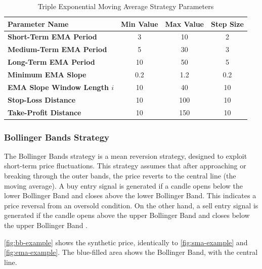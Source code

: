 \begin{table}[H]
    \centering
    \begin{tabular}{L{4cm}ccc}
        \toprule
        \textbf{Parameter Name} & Min Value & Max Value & Step Size
        \\
        \midrule
        \textbf{Short-Term EMA Period}       & 3   & 10  & 2   \\
        \textbf{Medium-Term EMA Period}      & 5   & 30  & 3   \\
        \textbf{Long-Term EMA Period}        & 10  & 50  & 5   \\
        \textbf{Minimum EMA Slope}           & 0.2 & 1.2 & 0.2 \\
        \textbf{EMA Slope Window Length $i$} & 10  & 40  & 10  \\
        \textbf{Stop-Loss Distance}          & 10  & 100 & 10  \\
        \textbf{Take-Profit Distance}        & 10  & 150 & 10  \\
        \bottomrule
    \end{tabular}
    \caption{Triple Exponential Moving Average Strategy Parameters}
    \label{tbl:ema-strategy-parameters}
\end{table}

\subsubsection{Bollinger Bands Strategy}

The Bollinger Bands strategy is a mean reversion strategy, designed to exploit short-term price fluctuations.
This strategy assumes that after approaching or breaking through the outer bands, the price reverts to the central line (the moving average).
A buy entry signal is generated if a candle opens below the lower Bollinger Band and closes above the lower Bollinger Band.
This indicates a price reversal from an oversold condition.
On the other hand, a sell entry signal is generated if the candle opens above the upper Bollinger Band and closes below the upper Bollinger Band \cite{bb-basics}.

\autoref{fig:bb-example} shows the synthetic price, identically to \autoref{fig:sma-example} and \autoref{fig:ema-example}.
The blue-filled area shows the Bollinger Band, with the central line.

